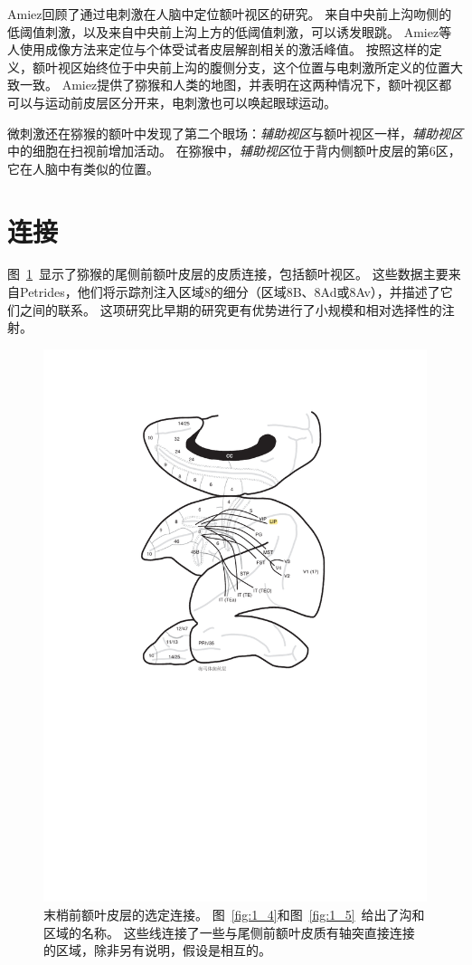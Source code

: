 Amiez\cite{amiez2009anatomical}回顾了通过电刺激在人脑中定位额叶视区的研究。
来自中央前上沟吻侧的低阈值刺激，以及来自中央前上沟上方的低阈值刺激，可以诱发眼跳。
Amiez等人\cite{amiez2006local}使用成像方法来定位与个体受试者皮层解剖相关的激活峰值。
按照这样的定义，额叶视区始终位于中央前上沟的腹侧分支，这个位置与电刺激所定义的位置大致一致。
Amiez\cite{amiez2009anatomical}提供了猕猴和人类的地图，并表明在这两种情况下，额叶视区都可以与运动前皮层区分开来，电刺激也可以唤起眼球运动。


微刺激还在猕猴的额叶中发现了第二个眼场：\textit{辅助视区}\cite{schlag1987evidence}与额叶视区一样，\textit{辅助视区}中的细胞在扫视前增加活动\cite{hanes1995relationship}。
在猕猴中，\textit{辅助视区}位于背内侧额叶皮层的第6区\cite{schlag1987evidence}，它在人脑中有类似的位置\cite{amiez2009anatomical}。



\section{连接}

图~\ref{fig:fig_5_2}~显示了猕猴的尾侧前额叶皮层的皮质连接，包括额叶视区。
这些数据主要来自Petrides\cite{petrides1999dorsolateral}，他们将示踪剂注入区域8的细分（区域8B、8Ad或8Av），并描述了它们之间的联系。
这项研究比早期的研究更有优势\cite{petrides1984projections,barbas1988anatomic,barbas1989architecture,cavada1989posterior}进行了小规模和相对选择性的注射。


\begin{figure}
	\centering
	\includegraphics[width=0.7\linewidth]{chap5/Fig_5_2}
	\caption{末梢前额叶皮层的选定连接。
		图~\ref{fig:1_4}和图~\ref{fig:1_5}~给出了沟和区域的名称。
		这些线连接了一些与尾侧前额叶皮质有轴突直接连接的区域，除非另有说明，假设是相互的。}
	\label{fig:fig_5_2}
\end{figure}


